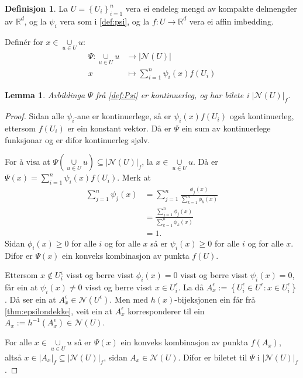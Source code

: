 \documentclass[a4paper, 12pt, norsk]{article}
\theoremstyle{plain}
\newtheorem{lemma}[theorem]{Lemma}
\theoremstyle{definition}
\newtheorem{definition}[theorem]{Definisjon}
\newcommand{\Rb}{\mathbb{R}}
\newcommand{\Nc}{\mathcal{N}}
\newcommand{\union}{ \mathop{\cup}\limits }
\newcommand{\gr}[1]{ \lvert #1 \rvert } %
\newcommand{\set}[1]{ \left\{ #1 \right\} } %
\newcommand{\tuple}[1]{ \left( #1 \right) } %
\begin{document}
\begin{definition} \label{def:Psi}
	La \( U = \set{U_i}_{i=1}^n \) vera ei endeleg mengd av kompakte delmengder av \( \Rb^d \), og la \( \psi_i \) vera som i \autoref{def:psi}, og la \( f: U \to \Rb^d \) vera ei affin imbedding. 
	
	Definér for \( x \in \union_{u \in U} u \):
	\begin{align*}
		\Psi : \union_{u \in U} u &\to \gr{\Nc(U)} \\
		x &\mapsto \sum_{i=1}^n \psi_i(x)f(U_i)
	\end{align*}
\end{definition}

\begin{lemma} \label{thm:psi-kont}
	Avbildinga \( \Psi \) frå \autoref{def:Psi} er kontinuerleg, og har bilete i \( \gr{\Nc(U)}_f \).
\end{lemma}

\begin{proof}
	Sidan alle \( \psi_i \)-ane er kontinuerlege, så er \( \psi_i(x) f(U_i) \) også kontinuerleg, ettersom \( f(U_i) \) er ein konstant vektor. Då er \( \Psi \) ein sum av kontinuerlege funksjonar og er difor kontinuerleg sjølv.

	For å visa at \( \Psi\tuple{\union_{u \in U} u} \subseteq \gr{\Nc(U)}_f \), la \( x \in \union_{u \in U} u \). Då er \( \Psi(x) = \sum_{i=1}^n \psi_i(x)f(U_i) \). Merk at
	\begin{align*}
		\sum_{j=1}^n \psi_j(x)  &= \sum_{j=1}^n \frac{\phi_j(x)}{\sum_{k=1}^n \phi_k(x)} \\
		&= \frac{\sum_{j=1}^n \phi_j(x)}{\sum_{k=1}^n \phi_k(x)} \\
		&= 1.
	\end{align*}
	Sidan \( \phi_i(x) \geq 0 \) for alle \( i \) og for alle \( x \) så er \( \psi_i(x) \geq 0 \) for alle \( i \) og for alle \( x \). Difor er \( \Psi(x) \) ein konveks kombinasjon av punkta \( f(U) \).

	Ettersom \( x \not\in U_i^\epsilon \) visst og berre visst \( \phi_i(x) = 0 \) visst og berre visst \( \psi_i(x) = 0 \), får ein at \( \psi_i(x) \neq 0 \) visst og berre visst \( x \in U_i^\epsilon \). La då \( A_x^\epsilon := \set{U_i^\epsilon \in U^\epsilon : x \in U_i^\epsilon} \). Då ser ein at \( A_x^\epsilon \in \Nc(U^\epsilon) \). Men med \( h(x) \)-bijeksjonen ein får frå \autoref{thm:epsilondekke}, veit ein at \( A_x^\epsilon \) korresponderer til ein \( A_x := h^{-1}(A_x^\epsilon) \in \Nc(U) \).
	
	For alle \( x \in \union_{u \in U} u \) så er \( \Psi(x) \) ein konveks kombinasjon av punkta \( f(A_x) \), altså \( x \in \gr{A_x}_f \subseteq \gr{\Nc(U)}_f \), sidan \( A_x \in \Nc(U) \). Difor er biletet til \( \Psi \) i \( \gr{\Nc(U)}_f \).
\end{proof}
\end{document}
